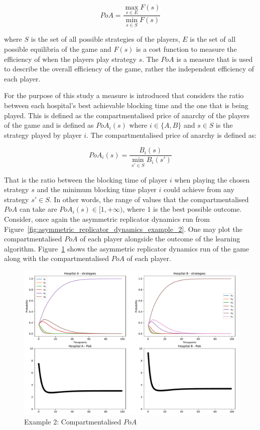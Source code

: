 \begin{equation}\label{eq:poa_definition}
    PoA = \frac{\max_{s \in E}{F(s)}}{\min_{s \in S}{F(s)}}
\end{equation}

where \(S\) is the set of all possible strategies of the players, \(E\) is the
set of all possible equilibria of the game and \(F(s)\) is a cost function to
measure the efficiency of when the players play strategy \(s\).
The \(PoA\) is a measure that is used to describe the overall efficiency of the
game, rather the independent efficiency of each player.

For the purpose of this study a measure is introduced that considers the
ratio between each hospital's best achievable blocking time and the one that is
being played.
This is defined as the compartmentalised price of anarchy of the
players of the game and is defined as \(PoA_i(s)\) where \(i \in \{A, B\}\) and
\(s \in S\) is the strategy played by player \(i\).
The compartmentalised price of anarchy is defined as:

\begin{equation}\label{eq:compartmentalised_poa_definition}
    PoA_i(s) = \frac{B_i(s)}{\min_{s' \in S}{B_i(s')}}
\end{equation}

That is the ratio between the blocking time of player \(i\) when playing the
chosen strategy \(s\) and the minimum blocking time player \(i\) could achieve
from any strategy \(s' \in S\).
In other words, the range of values that the compartmentalised \(PoA\) can take
are \(PoA_i(s) \in [1, +\infty)\), where \(1\) is the best possible outcome.
Consider, once again the asymmetric replicator dynamics run from
Figure~\ref{fig:asymmetric_replicator_dynamics_example_2}.
One may plot the compartmentalised \(PoA\) of each player alongside the outcome
of the learning algorithm.
Figure~\ref{fig:compartmentalised_poa_example_2} shows the asymmetric replicator
dynamics run of the game along with the compartmentalised \(PoA\) of each
player.

\begin{figure}[H]
    \centering
    \includegraphics[width=\linewidth]{chapters/05_numerical_results/Bin/example_2/poa_ard_example_2.pdf}
    \caption{Example 2: Compartmentalised \(PoA\)}
    \label{fig:compartmentalised_poa_example_2}
\end{figure}

